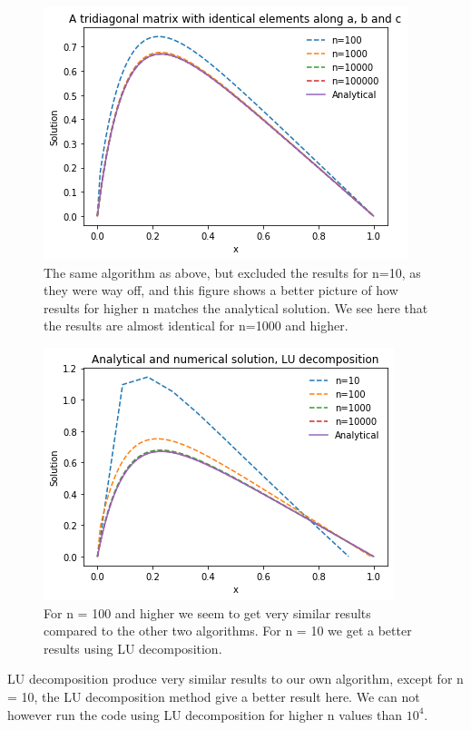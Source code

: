 \documentclass[oneside, final, 11pt, english, twocolumn]{article}
\begin{document}
\begin{figure}[H]
\centering
    \includegraphics[width=0.8\columnwidth]{sol2.png}
\caption{The same algorithm as above, but excluded the results for n=10, as they were way off, and this figure shows a better picture of how results for higher n matches the analytical solution. We see here that the results are almost identical for n=1000 and higher. }
\label{fig:bign}
\end{figure}

\begin{figure}[H]
\centering
    \includegraphics[width=0.8\columnwidth]{LU.png}
\caption{For n = 100 and higher we seem to get very similar results compared to the other two algorithms. For n = 10 we get a better results using LU decomposition. }
\label{fig:LU}
\end{figure}

LU decomposition produce very similar results to our own algorithm, except for n = 10, the LU decomposition method give a better result here. We can not however run the code using LU decomposition for higher n values than $10^4$. 
\end{document}
